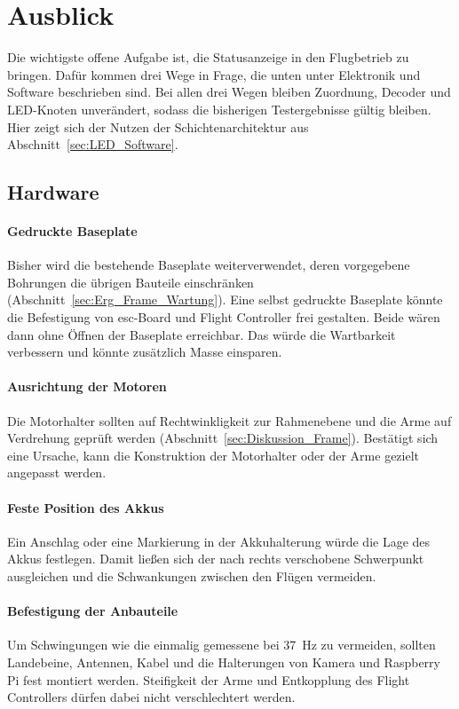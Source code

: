\section{Ausblick}
\label{sec:Ausblick}

Die wichtigste offene Aufgabe ist, die Statusanzeige in den Flugbetrieb zu bringen.
Dafür kommen drei Wege in Frage, die unten unter Elektronik und Software beschrieben sind.
Bei allen drei Wegen bleiben Zuordnung, Decoder und LED-Knoten unverändert, sodass die bisherigen Testergebnisse gültig
bleiben.
Hier zeigt sich der Nutzen der Schichtenarchitektur aus Abschnitt~\ref{sec:LED_Software}.

    \subsection{Hardware}
    \label{sec:Ausblick_Hardware}

    \paragraph{Gedruckte Baseplate}
    Bisher wird die bestehende Baseplate weiterverwendet, deren vorgegebene Bohrungen die übrigen Bauteile einschränken
    (Abschnitt~\ref{sec:Erg_Frame_Wartung}).
    Eine selbst gedruckte Baseplate könnte die Befestigung von \gls{esc}-Board und Flight Controller frei gestalten.
    Beide wären dann ohne Öffnen der Baseplate erreichbar.
    Das würde die Wartbarkeit verbessern und könnte zusätzlich Masse einsparen.

    \paragraph{Ausrichtung der Motoren}
    Die Motorhalter sollten auf Rechtwinkligkeit zur Rahmenebene und die Arme auf Verdrehung geprüft werden
    (Abschnitt~\ref{sec:Diskussion_Frame}).
    Bestätigt sich eine Ursache, kann die Konstruktion der Motorhalter oder der Arme gezielt angepasst werden.

    \paragraph{Feste Position des Akkus}
    Ein Anschlag oder eine Markierung in der Akkuhalterung würde die Lage des Akkus festlegen.
    Damit ließen sich der nach rechts verschobene Schwerpunkt ausgleichen und die Schwankungen zwischen den Flügen
    vermeiden.

    \paragraph{Befestigung der Anbauteile}
    Um Schwingungen wie die einmalig gemessene bei \SI{37}{\hertz} zu vermeiden, sollten Landebeine, Antennen, Kabel und
    die Halterungen von Kamera und Raspberry Pi fest montiert werden.
    Steifigkeit der Arme und Entkopplung des Flight Controllers dürfen dabei nicht verschlechtert werden.

